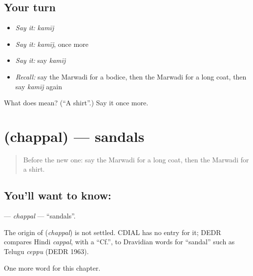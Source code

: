 \subsection*{Your turn}
\begin{itemize}
\raggedright
  \item \emph{Say it:} \emph{kamīj}
  \item \emph{Say it:} \emph{kamīj}, once more
  \item \emph{Say it:} say \emph{kamīj}
  \item \emph{Recall:} say the Marwadi for a bodice, then the Marwadi for a long coat, then say \emph{kamīj} again
\end{itemize}

\begin{tcolorbox}[breakable,colback=teal!4,colframe=teal!35!black,title={Before you move on}]
What does  mean? (\textquotedblleft{}A shirt\textquotedblright{}.) Say it once more.
\end{tcolorbox}
\section[\texorpdfstring{\mw{चप्पल} (chappal)}{चप्पल (chappal)}]{ (chappal) — sandals}

\label{lesson:MW-C129-chappal}



\begin{quote}
Before the new one: say the Marwadi for a long coat, then the Marwadi for a shirt.
\end{quote}

\subsection*{You'll want to know: }
\textbf{} — \emph{chappal} — \textquotedblleft{}sandals\textquotedblright{}.

\begin{cousinweb}
The origin of \textbf{} (\emph{chappal}) is not settled. CDIAL has no entry for it; DEDR compares Hindi \emph{cappal}, with a \textquotedblleft{}Cf.\textquotedblright{}, to Dravidian words for \textquotedblleft{}sandal\textquotedblright{} such as Telugu \emph{ceppu} (DEDR 1963).
\end{cousinweb}

\begin{grammarlens}[title={What you've built}]
One more word for this chapter.
\end{grammarlens}

